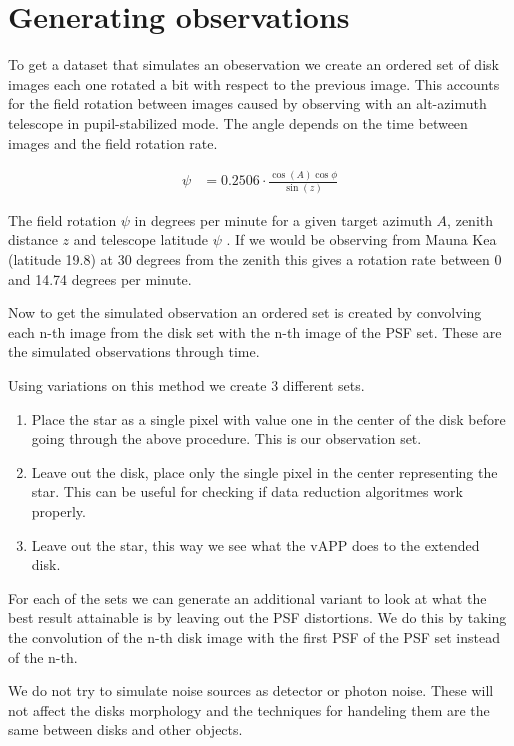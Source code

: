 




\section{Generating observations}
\label{sec:gen}
To get a dataset that simulates an obeservation we create an ordered set of disk images each one rotated a bit with respect to the previous image. This accounts for the field rotation between images caused by observing with an alt-azimuth telescope in pupil-stabilized mode. The angle depends on the time between images and the field rotation rate.

\begin{align}
  \psi &= 0.2506 \cdot \frac{\cos(A) \cos \phi}{\sin(z)} 
\end{align}

The field rotation $\psi$ in degrees per minute for a given target azimuth $A$, zenith distance $z$ and telescope latitude $\psi$ \cite[page 95]{Electronic_imaging}. If we would be observing from Mauna Kea (latitude 19.8) at 30 degrees from the zenith this gives a rotation rate between 0 and 14.74 degrees per minute.%

Now to get the simulated observation an ordered set is created by convolving each n-th image from the disk set with the n-th image of the  \ac{PSF}  set. These are the simulated observations through time. 

Using variations on this method we create 3 different sets.

\begin{enumerate}
\item Place the star as a single pixel with value one in the center of the disk before going through the above procedure. This is our observation set.
\item Leave out the disk, place only the single pixel in the center representing the star. This can be useful for checking if data reduction algoritmes work properly.
\item Leave out the star, this way we see what the \ac{vAPP} does to the extended disk.
\end{enumerate}

For each of the sets we can generate an additional variant to look at what the best result attainable is by leaving out the  \ac{PSF}  distortions. We do this by taking the convolution of the n-th disk image with the first \ac{PSF} of the \ac{PSF} set instead of the n-th.

We do not try to simulate noise sources as detector or photon noise. These will not affect the disks morphology and the techniques for handeling them are the same between disks and other objects.
